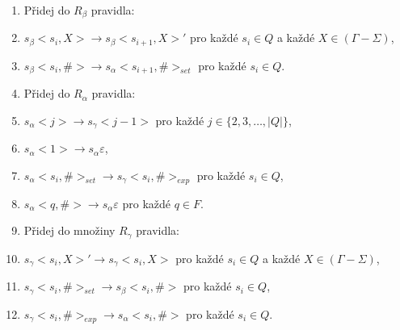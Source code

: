 \begin{Alg}
\begin{list}{}{\setlength\parsep{0cm} \setlength\itemsep{0cm} \setlength\leftmargin{1em}}
\begin{enumerate}

   \item Přidej do $R_\beta$ pravidla:

\renewcommand{\labelenumi}{(\roman{enumi})}

   \item $s_\beta <s_i, X> \rightarrow s_\beta <s_{i+1}, X>'$ pro každé $s_i \in Q$ a každé $X \in (\Gamma - \Sigma)$,
   \item $s_\beta <s_i, \#> \rightarrow s_\alpha <s_{i+1}, \#>_{set}$ pro každé $s_i \in Q$.


   \item Přidej do $R_\alpha$ pravidla:

\renewcommand{\labelenumi}{(\roman{enumi})}

   \item $s_\alpha <j> \rightarrow s_\gamma <j - 1 > $ pro každé $j \in \{2,3,\dots,|Q|\}$,
   \item $s_\alpha <1> \rightarrow s_\alpha \varepsilon $,
   \item $s_\alpha <s_i, \#>_{set} \rightarrow s_\gamma <s_{i}, \#>_{exp}$ pro každé $s_i \in Q$,
   \item $s_\alpha <q, \#> \rightarrow s_\alpha \varepsilon $ pro každé $q \in F$.


   \item Přidej do množiny $R_\gamma$ pravidla:

\renewcommand{\labelenumi}{(\roman{enumi})}

   \item $s_\gamma <s_i, X>' \rightarrow s_\gamma <s_i, X> $ pro každé $s_i \in Q$ a každé $X \in (\Gamma - \Sigma)$,
   \item $s_\gamma <s_i, \#>_{set} \rightarrow s_\beta <s_i, \#>$ pro každé $s_i \in Q$,
   \item $s_\gamma <s_i, \#>_{exp} \rightarrow s_\alpha <s_{i}, \#>$ pro každé $s_i \in Q$.

\end{enumerate}

\end{list}
\end{Alg}



